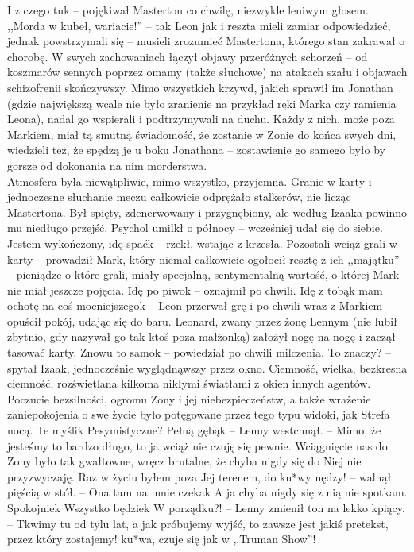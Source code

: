 \documentclass[../MAIN.tex]{subfiles}
\begin{document}
\sx I z czego tu\3k -- pojękiwał Masterton co chwilę, niezwykle leniwym głosem.
\qd
,,Morda w kubeł, wariacie!'' -- tak Leon jak i reszta mieli zamiar odpowiedzieć, jednak powstrzymali się -- musieli zrozumieć Mastertona, którego stan zakrawał o chorobę. W swych zachowaniach łączył objawy przeróżnych schorzeń -- od koszmarów sennych poprzez omamy (także słuchowe) na atakach szału i objawach schizofrenii skończywszy. Mimo wszystkich krzywd, jakich sprawił im Jonathan (gdzie największą wcale nie było zranienie na przykład ręki Marka czy ramienia Leona), nadal go wspierali i podtrzymywali na duchu. Każdy z nich, może poza Markiem, miał tą smutną świadomość, że zostanie w Zonie do końca swych dni, wiedzieli też, że spędzą je u boku Jonathana -- zostawienie go samego było by gorsze od dokonania na nim morderstwa.\\
Atmosfera była niewątpliwie, mimo wszystko, przyjemna. Granie w karty i jednoczesne słuchanie meczu całkowicie odprężało stalkerów, nie licząc Mastertona. Był spięty, zdenerwowany i przygnębiony, ale według Izaaka powinno mu niedługo przejść. Psychol umilkł o północy -- wcześniej udał się do siebie.
\sx Jestem wykończony, idę spać\3k -- rzekł, wstając z krzesła.
\qd
Pozostali wciąż grali w karty -- prowadził Mark, który niemal całkowicie ogołocił resztę z ich ,,majątku'' -- pieniądze o które grali, miały specjalną, sentymentalną wartość, o której Mark nie miał jeszcze pojęcia.
\sx Idę po piwo\3k -- oznajmił po chwili.
\xx Idę z tobą\3k mam ochotę na coś mocniejszego\3k -- Leon przerwał grę i po chwili wraz z Markiem opuścił pokój, udając się do baru.
\qd
Leonard, zwany przez żonę Lennym (nie lubił zbytnio, gdy nazywał go tak ktoś poza małżonką) założył nogę na nogę i zaczął tasować karty.
\sx Znowu to samo\3k -- powiedział po chwili milczenia.
\xx To znaczy? -- spytał Izaak, jednocześnie wyglądnąwszy przez okno. 
\qd
Ciemność, wielka, bezkresna ciemność, rozświetlana kilkoma nikłymi światłami z okien innych agentów. Poczucie bezsilności, ogromu Zony i jej niebezpieczeństw, a także wrażenie zaniepokojenia o swe życie było potęgowane przez tego typu widoki, jak Strefa nocą.
\sx Te myśli\3k
\xx Pesymistyczne?
\xx Pełną gębą\3k -- Lenny westchnął. -- Mimo, że jesteśmy to bardzo długo, to ja wciąż nie czuję się pewnie. Wciągnięcie nas do Zony było tak gwałtowne, wręcz brutalne, że chyba nigdy się do Niej nie przyzwyczaję. Raz w życiu byłem poza Jej terenem, do ku*wy nędzy! -- walnął pięścią w stół. -- Ona tam na mnie czeka\3k A ja chyba nigdy się z nią nie spotkam.
\xx Spokojnie\3k Wszystko będzie\3k
\xx W porządku?! -- Lenny zmienił ton na lekko kpiący. -- Tkwimy tu od tylu lat, a jak próbujemy wyjść, to zawsze jest jakiś pretekst, przez który zostajemy! ku*wa, czuje się jak w ,,Truman Show''!
\qd
\end{document}
